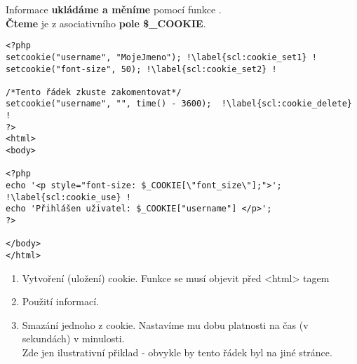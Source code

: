 Informace \textbf{ukládáme a měníme} pomocí funkce .\\
\textbf{Čteme} je z asociativního \textbf{pole \$\_COOKIE}.  

\begin{minipage}[t]{.45\textwidth}
\begin{code}
\begin{verbatim}
<?php
setcookie("username", "MojeJmeno"); !\label{scl:cookie_set1} !
setcookie("font-size", 50); !\label{scl:cookie_set2} !

/*Tento řádek zkuste zakomentovat*/
setcookie("username", "", time() - 3600);  !\label{scl:cookie_delete} !
?>
<html>
<body>

<?php
echo '<p style="font-size: $_COOKIE[\"font_size\"];">'; !\label{scl:cookie_use} !
echo 'Přihlášen uživatel: $_COOKIE["username"] </p>'; 
?>

</body>
</html> 
\end{verbatim}

\label{code:cookie}
\end{code}
\end{minipage}
\begin{minipage}[t]{.45\textwidth}
\vspace{-1cm}
\begin{enumerate}
\item[ř. \ref{scl:cookie_set1}, \ref{scl:cookie_set2}:] Vytvoření (uložení) cookie. Funkce  se musí objevit před <html> tagem
\item[ř. \ref{scl:cookie_use}:] Použití informací.
\item[ř. \ref{scl:cookie_delete}:] Smazání jednoho z cookie. Nastavíme mu dobu platnosti na čas (v sekundách) v minulosti.\\
Zde jen ilustrativní přiklad - obvykle by tento řádek byl na jiné stránce.
\end{enumerate}
\end{minipage}

